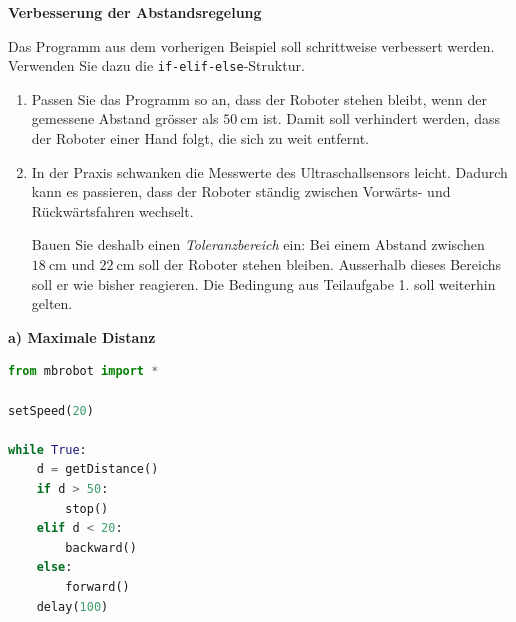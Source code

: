 \begin{myexercise}
    \textbf{Verbesserung der Abstandsregelung}

    Das Programm aus dem vorherigen Beispiel soll
    schrittweise verbessert werden. Verwenden Sie dazu die \texttt{if-elif-else}-Struktur.

    \begin{enumerate}
        \item Passen Sie das Programm so an, dass der Roboter
              stehen bleibt, wenn der gemessene Abstand
              grösser als \(\SI{50}{\centi\meter}\) ist.
              Damit soll verhindert werden, dass der Roboter
              einer Hand folgt, die sich zu weit entfernt.


        \item In der Praxis schwanken die Messwerte des
              Ultraschallsensors leicht. Dadurch kann es
              passieren, dass der Roboter ständig zwischen
              Vorwärts- und Rückwärtsfahren wechselt.

              Bauen Sie deshalb einen \emph{Toleranzbereich}
              ein: Bei einem Abstand zwischen
              \(\SI{18}{\centi\meter}\) und
              \(\SI{22}{\centi\meter}\) soll der Roboter
              stehen bleiben. Ausserhalb dieses Bereichs
              soll er wie bisher reagieren. Die Bedingung
              aus Teilaufgabe 1. soll weiterhin gelten.
    \end{enumerate}

    \begin{myanswer}
        \textbf{a) Maximale Distanz}

        \begin{lstlisting}[language=Python]
from mbrobot import *

setSpeed(20)

while True:
    d = getDistance()
    if d > 50:
        stop()
    elif d < 20:
        backward()
    else:
        forward()
    delay(100)
        \end{lstlisting}


\end{myanswer}
\end{myexercise}
